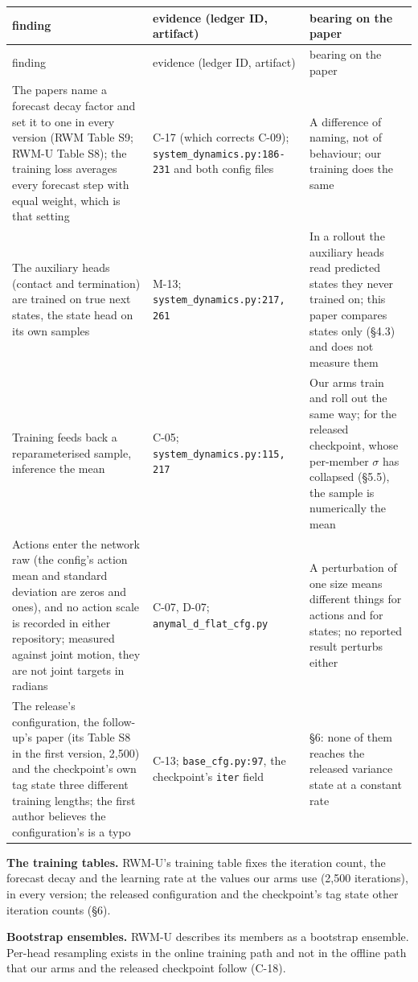 \documentclass[10pt]{article}
\begin{document}
\begingroup\small
\begin{longtable}{>{\raggedright\arraybackslash}p{}>{\raggedright\arraybackslash}p{}>{\raggedright\arraybackslash}p{}}
\toprule finding & evidence (ledger ID, artifact) & bearing on the paper \\ \midrule\endfirsthead
\toprule finding & evidence (ledger ID, artifact) & bearing on the paper \\ \midrule\endhead
\bottomrule\endlastfoot
The papers name a forecast decay factor and set it to one in every version (RWM Table S9; RWM-U Table S8); the training loss averages every forecast step with equal weight, which is that setting & C-17 (which corrects C-09); \texttt{system\_\allowbreak{}dynamics\allowbreak{}.py:186-231} and both config files & A difference of naming, not of behaviour; our training does the same \\
The auxiliary heads (contact and termination) are trained on true next states, the state head on its own samples & M-13; \texttt{system\_\allowbreak{}dynamics\allowbreak{}.py:217, 261} & In a rollout the auxiliary heads read predicted states they never trained on; this paper compares states only (\S{}4.3) and does not measure them \\
Training feeds back a reparameterised sample, inference the mean & C-05; \texttt{system\_\allowbreak{}dynamics\allowbreak{}.py:115, 217} & Our arms train and roll out the same way; for the released checkpoint, whose per-member $\sigma$ has collapsed (\S{}5.5), the sample is numerically the mean \\
Actions enter the network raw (the config's action mean and standard deviation are zeros and ones), and no action scale is recorded in either repository; measured against joint motion, they are not joint targets in radians & C-07, D-07; \texttt{anymal\_\allowbreak{}d\_\allowbreak{}flat\_\allowbreak{}cfg\allowbreak{}.py} & A perturbation of one size means different things for actions and for states; no reported result perturbs either \\
The release's configuration, the follow-up's paper (its Table S8 in the first version, 2,500) and the checkpoint's own tag state three different training lengths; the first author believes the configuration's is a typo & C-13; \texttt{base\_\allowbreak{}cfg\allowbreak{}.py:97}, the checkpoint's \texttt{iter} field & \S{}6: none of them reaches the released variance state at a constant rate \\
\end{longtable}\endgroup

\textbf{The training tables.} RWM-U's training table fixes the iteration count, the forecast decay and the learning rate at the values our arms use (2,500 iterations), in every version; the released configuration and the checkpoint's tag state other iteration counts (\S{}6).

\textbf{Bootstrap ensembles.} RWM-U describes its members as a bootstrap ensemble. Per-head resampling exists in the online training path and not in the offline path that our arms and the released checkpoint follow (C-18).
\end{document}
